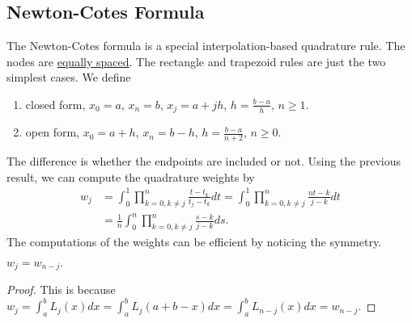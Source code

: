 \subsection{Newton-Cotes Formula}
The Newton-Cotes formula is a special interpolation-based quadrature rule. The nodes are \underline{equally spaced}. The rectangle and trapezoid rules are just the two simplest cases. We define 
\begin{enumerate}
    \item closed form, $x_0 = a$, $x_n = b$, $x_j = a  + jh$, $h = \frac{b-a}{h}$, $n\ge 1$. 
    \item open form, $x_0 = a + h$, $x_n = b - h$, $h = \frac{b-a}{n+2}$, $n\ge 0$.
\end{enumerate}
The difference is whether the endpoints are included or not. Using the previous result, we can compute the quadrature weights by 
\begin{equation}
    \begin{aligned}
        w_j &= \int_0^1 \prod_{k=0, k\neq j}^n \frac{t - t_k}{t_j - t_k} dt =  \int_0^1 \prod_{k=0, k\neq j}^n \frac{nt - k}{j- k} dt \\
        &=\frac{1}{n}\int_0^n \prod_{k=0, k\neq j}^n \frac{s - k}{j - k} ds. 
    \end{aligned}
\end{equation}
The computations of the weights can be efficient by noticing the symmetry. 
\begin{lemma} $w_j = w_{n - j}.$
\end{lemma}
\begin{proof}
    This is because $w_j = \int_a^b L_j(x) dx = \int_a^b L_j(a + b - x) dx = \int_a^b L_{n-j}(x) dx = w_{n-j}.$
\end{proof}

